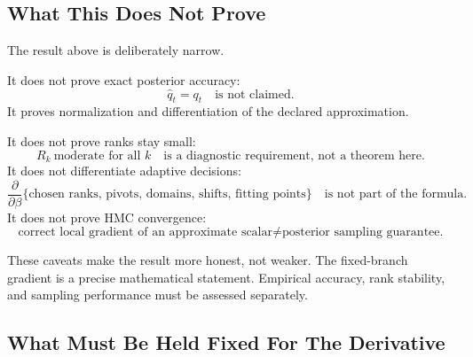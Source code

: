 \documentclass[11pt]{article}
\numberwithin{equation}{section}
\begin{document}
\subsection{What This Does Not Prove}

The result above is deliberately narrow.

It does not prove exact posterior accuracy:
\begin{equation}
    \widehat q_t=q_t
    \quad\text{is not claimed.}
    \label{eq:p24-p19-90}
\end{equation}
It proves normalization and differentiation of the declared approximation.

It does not prove ranks stay small:
\begin{equation}
    R_k\ \text{moderate for all }k
    \quad\text{is a diagnostic requirement, not a theorem here.}
    \label{eq:p24-p19-91}
\end{equation}
It does not differentiate adaptive decisions:
\begin{equation}
    \frac{\partial}{\partial\beta}
    \{\text{chosen ranks, pivots, domains, shifts, fitting points}\}
    \quad\text{is not part of the formula.}
    \label{eq:p24-p19-92}
\end{equation}
It does not prove HMC convergence:
\begin{equation}
    \text{correct local gradient of an approximate scalar}
    \ne
    \text{posterior sampling guarantee.}
    \label{eq:p24-p19-93}
\end{equation}

These caveats make the result more honest, not weaker.  The fixed-branch
gradient is a precise mathematical statement.  Empirical accuracy, rank
stability, and sampling performance must be assessed separately.

\subsection{What Must Be Held Fixed For The Derivative}
\end{document}
